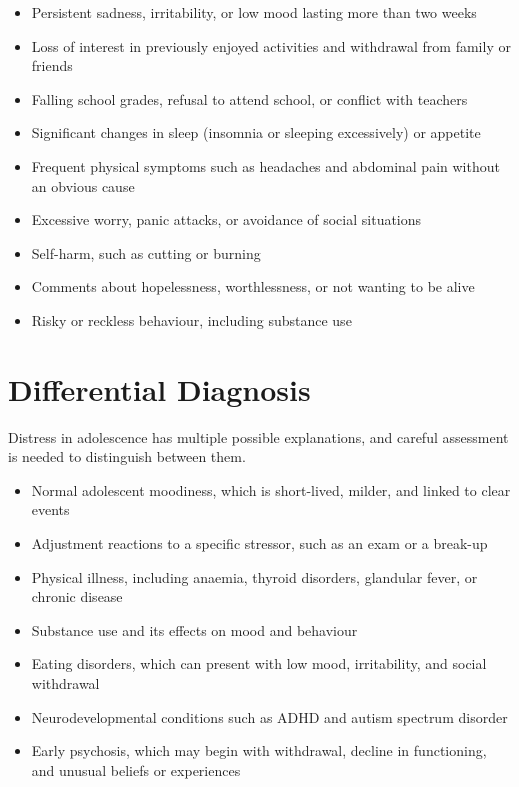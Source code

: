 \begin{itemize}
    \item Persistent sadness, irritability, or low mood lasting more than two weeks
    \item Loss of interest in previously enjoyed activities and withdrawal from family or friends
    \item Falling school grades, refusal to attend school, or conflict with teachers
    \item Significant changes in sleep (insomnia or sleeping excessively) or appetite
    \item Frequent physical symptoms such as headaches and abdominal pain without an obvious cause
    \item Excessive worry, panic attacks, or avoidance of social situations
    \item Self-harm, such as cutting or burning
    \item Comments about hopelessness, worthlessness, or not wanting to be alive
    \item Risky or reckless behaviour, including substance use
\end{itemize}

\section*{Differential Diagnosis}
Distress in adolescence has multiple possible explanations, and careful assessment is needed to distinguish between them.

\begin{itemize}
    \item Normal adolescent moodiness, which is short-lived, milder, and linked to clear events
    \item Adjustment reactions to a specific stressor, such as an exam or a break-up
    \item Physical illness, including anaemia, thyroid disorders, glandular fever, or chronic disease
    \item Substance use and its effects on mood and behaviour
    \item Eating disorders, which can present with low mood, irritability, and social withdrawal
    \item Neurodevelopmental conditions such as ADHD and autism spectrum disorder
    \item Early psychosis, which may begin with withdrawal, decline in functioning, and unusual beliefs or experiences
\end{itemize}

